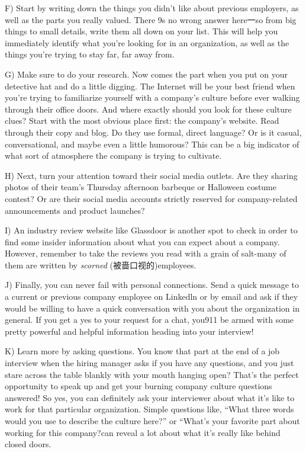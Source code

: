 \documentclass[UTF8,11pt]{ctexart}
\begin{document}
F) Start by writing down the things you didn't like about previous employers, as well as the parts you really valued. There 9s no wrong answer here一so from big things to small details, write them all down on your list. This will help you immediately identify what you're looking for in an organization, as well as the things you're trying to stay far, far away from.


G) Make sure to do your research. Now comes the part when you put on your detective hat and do a little digging. The Internet will be your best friend when you're trying to familiarize yourself with a company's culture before ever walking through their office doors. And where exactly should you look for these culture clues? Start with the most obvious place first: the company's website. Read through their copy and blog. Do they use formal, direct language? Or is it casual, conversational, and maybe even a little humorous? This can be a big indicator of what sort of atmosphere the company is trying to cultivate.


H) Next, turn your attention toward their social media outlets. Are they sharing photos of their team's Thursday afternoon barbeque or Halloween costume contest? Or are their social media accounts strictly reserved for company-related announcements and product launches?


I) An industry review website like Glassdoor is another spot to check in order to find some insider information about what you can expect about a company. However, remember to take the reviews you read with a grain of salt-many of them are written by \textit{scorned} (被啬口视的)employees.


J) Finally, you can never fail with personal connections. Send a quick message to a current or previous company employee on Linkedln or by email and ask if they would be willing to have a quick conversation with you about the organization in general. If you get a yes to your request for a chat, you911 be armed with some pretty powerful and helpful information heading into your interview!


K) Learn more by asking questions. You know that part at the end of a job interview when the hiring manager asks if you have any questions, and you just stare across the table blankly with your mouth hanging open? That's the perfect opportunity to speak up and get your burning company culture questions answered! So yes, you can definitely ask your interviewer about what it's like to work for that particular organization. Simple questions like, “What three words would you use to describe the culture here?” or “What's your favorite part about working for this company?can reveal a lot about what it's really like behind closed doors.
\end{document}
